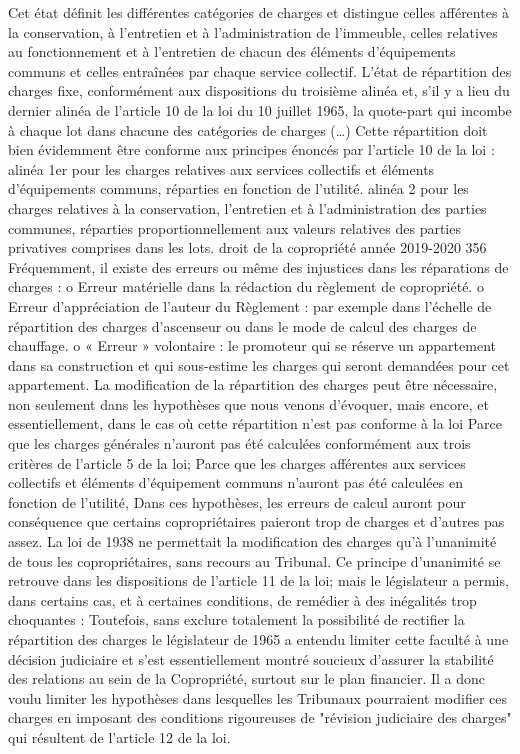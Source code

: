 Cet état définit les différentes catégories de charges et distingue celles afférentes à la conservation, à l'entretien et à l'administration de l'immeuble, celles relatives au fonctionnement et à l'entretien de chacun des éléments d'équipements communs et celles entraînées par chaque service collectif.
L'état de répartition des charges fixe, conformément aux dispositions du troisième alinéa et, s'il y a lieu du dernier alinéa de l'article 10 de la loi du 10 juillet 1965, la quote-part qui incombe à chaque lot dans chacune des catégories de charges (…)
Cette répartition doit bien évidemment être conforme aux principes énoncés par l'article 10 de la loi :
alinéa 1er pour les charges relatives aux services collectifs et éléments d'équipements communs, réparties en fonction de l'utilité.
alinéa 2 pour les charges relatives à la conservation, l'entretien et à l'administration des parties communes, réparties proportionnellement aux valeurs relatives des parties privatives comprises dans les lots.
droit de la copropriété année 2019-2020
356
Fréquemment, il existe des erreurs ou même des injustices dans les réparations de charges :
o Erreur matérielle dans la rédaction du règlement de copropriété.
o Erreur d'appréciation de l'auteur du Règlement : par exemple dans l'échelle de répartition des charges d'ascenseur ou dans le mode de calcul des charges de chauffage.
o « Erreur » volontaire : le promoteur qui se réserve un appartement dans sa construction et qui sous-estime les charges qui seront demandées pour cet appartement.
La modification de la répartition des charges peut être nécessaire, non seulement dans les hypothèses que nous venons d'évoquer, mais encore, et essentiellement, dans le cas où cette répartition n'est pas conforme à la loi
Parce que les charges générales n'auront pas été calculées conformément aux trois critères de l'article 5 de la loi;
Parce que les charges afférentes aux services collectifs et éléments d'équipement communs n'auront pas été calculées en fonction de l'utilité,
Dans ces hypothèses, les erreurs de calcul auront pour conséquence que certains copropriétaires paieront trop de charges et d'autres pas assez.
La loi de 1938 ne permettait la modification des charges qu'à l'unanimité de tous les copropriétaires, sans recours au Tribunal.
Ce principe d'unanimité se retrouve dans les dispositions de l'article 11 de la loi; mais le législateur a permis, dans certains cas, et à certaines conditions, de remédier à des inégalités trop choquantes :
Toutefois, sans exclure totalement la possibilité de rectifier la répartition des charges le législateur de 1965 a entendu limiter cette faculté à une décision judiciaire et s'est essentiellement montré soucieux d'assurer la stabilité des relations au sein de la Copropriété, surtout sur le plan financier. Il a donc voulu limiter les hypothèses dans lesquelles les Tribunaux pourraient modifier ces charges en imposant des conditions rigoureuses de "révision judiciaire des charges" qui résultent de l'article 12 de la loi.
